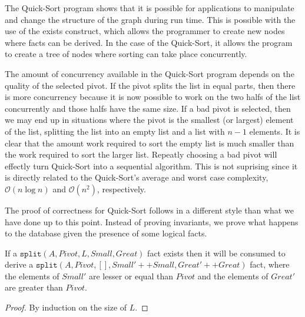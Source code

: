 The Quick-Sort program shows that it is possible for applications to manipulate
and change the structure of the graph during run time. This is possible with the
use of the exists construct, which allows the programmer to create new nodes
where facts can be derived. In the case of the Quick-Sort, it allows the program
to create a tree of nodes where sorting can take place concurrently.

The amount of concurrency available in the Quick-Sort program depends on the
quality of the selected pivot. If the pivot splits the list in equal parts, then
there is more concurrency because it is now possible to work on the two halfs of
the list concurrently and those halfs have the same size. If a bad pivot is
selected, then we may end up in situations where the pivot is the smallest (or
largest) element of the list, splitting the list into an empty list and a list
with $n-1$ elements. It is clear that the amount work required to sort the
empty list is much smaller than the work required to sort the larger list.
Repeatly choosing a bad pivot will effectly turn Quick-Sort into a sequential
algorithm. This is not suprising since it is directly related to the
Quick-Sort's average and worst case complexity, $\mathcal{O}(n \log{n})$ and
$\mathcal{O}(n^2)$, respectively.

The proof of correctness for Quick-Sort follows in a different style than what
we have done up to this point. Instead of proving invariants, we prove what
happens to the database given the presence of some logical facts.

\begin{lemma}

If a $\mathtt{split}(A, Pivot, L, Small, Great)$ fact exists then it will be
consumed to derive a $\mathtt{split}(A, Pivot, [], Small' ++ Small, Great' ++
Great)$ fact, where the elements of $Small'$ are lesser or equal than $Pivot$
and the elements of $Great'$ are greater than $Pivot$.

\end{lemma}
\begin{proof}
By induction on the size of $L$.
\end{proof}

